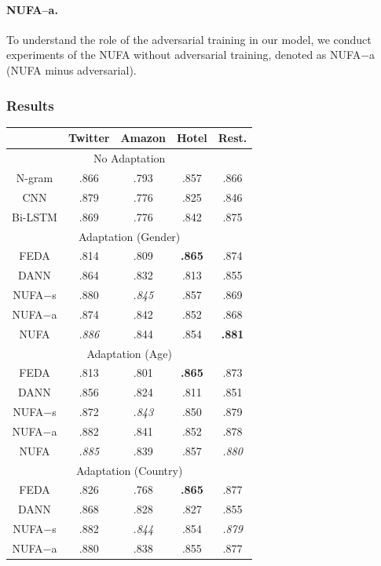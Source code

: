 \paragraph{NUFA--a.} 
To understand the role of the adversarial training in our model, we conduct experiments of the NUFA without adversarial training, denoted as NUFA$-$a (NUFA minus adversarial).


\subsubsection{Results}


\begin{table}[t!]
\centering
\begin{tabular}{c|c|c|c|c}
 & Twitter & Amazon & Hotel & Rest. \\\hline
 \multicolumn{5}{c}{No Adaptation} \\\hline
N-gram & .866 & .793 & .857 & .866 \\
CNN & .879 & .776 & .825 & .846 \\
Bi-LSTM & .869 & .776 & .842 & .875 \\\hline
\multicolumn{5}{c}{Adaptation (Gender)} \\\hline
FEDA & .814 & .809 & \textbf{.865} & .874 \\
DANN & .864 & .832 & .813 & .855 \\ \hline
NUFA$-$s & .880 & \em .845 & .857 & .869 \\
NUFA$-$a & .874 & .842 & .852 & .868 \\
NUFA & \em .886 & .844 & .854 & \textbf{.881} \\ \hline
\multicolumn{5}{c}{Adaptation (Age)} \\\hline
FEDA & .813 & .801 & \bf .865 & .873 \\
DANN & .856 & .824 & .811 & .851 \\ \hline
NUFA$-$s & .872 & \em .843 & .850 & .879 \\
NUFA$-$a & .882 & .841 & .852 & .878 \\
NUFA & \em .885 & .839 & .857 & \em .880 \\ \hline
\multicolumn{5}{c}{Adaptation (Country)} \\\hline
FEDA & .826 & .768 & \bf .865 & .877 \\
DANN & .868 & .828 & .827 & .855 \\ \hline
NUFA$-$s & .882 & \em .844 & .854 & \em .879 \\
NUFA$-$a & .880 & .838 & .855 & .877 \\

\end{tabular}
\end{table}
